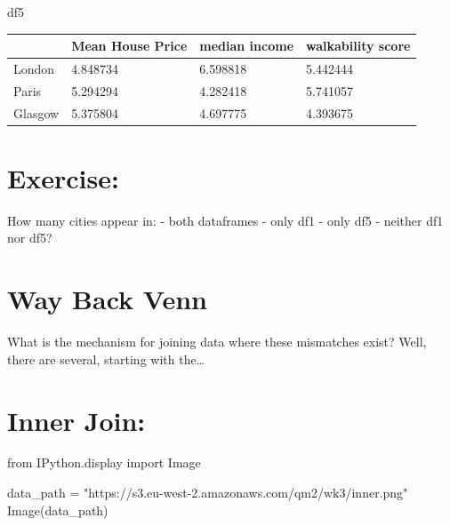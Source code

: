 \documentclass[
  letterpaper,
  DIV=11,
  numbers=noendperiod]{scrreprt}
\newenvironment{Shaded}{\begin{snugshade}}{\end{snugshade}}
\newcommand{\ImportTok}[1]{\textcolor[rgb]{0.00,0.46,0.62}{#1}}
\newcommand{\NormalTok}[1]{\textcolor[rgb]{0.00,0.23,0.31}{#1}}
\newcommand{\OperatorTok}[1]{\textcolor[rgb]{0.37,0.37,0.37}{#1}}
\newcommand{\StringTok}[1]{\textcolor[rgb]{0.13,0.47,0.30}{#1}}
\begin{document}
\begin{Shaded}
\begin{Highlighting}[]
\NormalTok{df5}
\end{Highlighting}
\end{Shaded}

\begin{longtable}[]{@{}llll@{}}
\toprule\noalign{}
& Mean House Price & median income & walkability score \\
\midrule\noalign{}
\endhead
\bottomrule\noalign{}
\endlastfoot
London & 4.848734 & 6.598818 & 5.442444 \\
Paris & 5.294294 & 4.282418 & 5.741057 \\
Glasgow & 5.375804 & 4.697775 & 4.393675 \\
\end{longtable}

\hypertarget{exercise-17}{%
\section{Exercise:}\label{exercise-17}}

How many cities appear in: - both dataframes - only df1 - only df5 -
neither df1 nor df5?

\hypertarget{way-back-venn}{%
\section{Way Back Venn}\label{way-back-venn}}

What is the mechanism for joining data where these mismatches exist?
Well, there are several, starting with the\ldots{}

\hypertarget{inner-join}{%
\section{Inner Join:}\label{inner-join}}

\begin{Shaded}
\begin{Highlighting}[]
\ImportTok{from}\NormalTok{ IPython.display }\ImportTok{import}\NormalTok{ Image}

\NormalTok{data\_path }\OperatorTok{=} \StringTok{"https://s3.eu{-}west{-}2.amazonaws.com/qm2/wk3/inner.png"}
\NormalTok{Image(data\_path)}
\end{Highlighting}
\end{Shaded}
\end{document}
